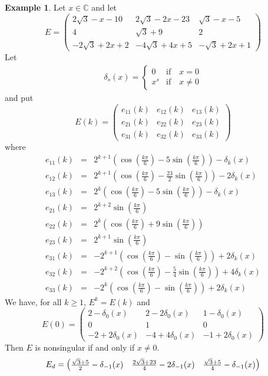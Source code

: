 \documentclass[12pt]{amsart}
\theoremstyle{definition}
\newtheorem{example}[thrm]{Example}
\numberwithin{equation}{section}
\numberwithin{equation}{section}
\newcommand{\e}{{\mathrm{e}}}
\begin{document}
\begin{example} Let $x\in \mathbb{C}$ and let
$$E=\begin{pmatrix}
2\sqrt{3}-x-10&2\sqrt{3}-2x-23&\sqrt{3}-x-5\\4&\sqrt{3}+9&2\\
-2\sqrt{3}+2x+2&-4\sqrt{3}+4x+5&-\sqrt{3}+2x+1
\end{pmatrix}$$
Let
\begin{eqnarray*}
\delta_{s}(x)=\begin{cases}
0 &\text{if}\quad x=0\\x^{s} &\text{if}\quad x\neq 0
\end{cases}
\end{eqnarray*}
and put
$$E(k)=
\begin{pmatrix}
e_{11}(k)&e_{12}(k)&e_{13}(k)\\e_{21}(k)&e_{22}(k)&e_{23}(k)\\e_{31}(k)&e_{32}(k)&e_{33}(k)
\end{pmatrix}$$
where
\begin{eqnarray*}
e_{11}(k)&=&2^{k+1}(\cos(\frac{k\pi}{6})-5\sin(\frac{k\pi}{6}))-\delta_{k}(x)\\
e_{12}(k)&=&2^{k+1}(\cos(\frac{k\pi}{6})-\frac{23}{2}\sin(\frac{k\pi}{6}))-2\delta_{k}(x)\\
e_{13}(k)&=&2^{k}(\cos(\frac{k\pi}{6})-5\sin(\frac{k\pi}{6}))-\delta_{k}(x)\\
e_{21}(k)&=&2^{k+2}\sin(\frac{k\pi}{6})\\
e_{22}(k)&=&2^{k}(\cos(\frac{k\pi}{6})+9\sin(\frac{k\pi}{6}))\\
e_{23}(k)&=&2^{k+1}\sin(\frac{k\pi}{6})\\
e_{31}(k)&=&-2^{k+1}(\cos(\frac{k\pi}{6})-\sin(\frac{k\pi}{6}))+2\delta_{k}(x)\\
e_{32}(k)&=&-2^{k+2}(\cos(\frac{k\pi}{6})-\frac{5}{4}\sin(\frac{k\pi}{6}))+4\delta_{k}(x)\\
e_{33}(k)&=&-2^{k}(\cos(\frac{k\pi}{6})-\sin(\frac{k\pi}{6}))+2\delta_{k}(x)
\end{eqnarray*}
We have, for all $k\geq1$,
$E^{k}=E(k)$ and
$$E(0)=\begin{pmatrix} 2-\delta_{0}(x)&2-2\delta_{0}(x)&1-\delta_{0}(x)\\0&1&0\\-2+2\delta_{0}(x)&-4+4\delta_{0}(x)&-1+2\delta_{0}(x)\end{pmatrix}$$
Then $E$ is nonsingular if and only if $x\neq 0$.
$$E_{d}=\begin{pmatrix} \frac{\sqrt{3}+5}{2}-\delta_{-1}(x)&\frac{2\sqrt{3}+23}{4}-2\delta_{-1}(x)&\frac{\sqrt{3}+5}{4}-\delta_{-1}(x)\vspace*{0.1pc}\\

\end{pmatrix}$$
\end{example}
\end{document}
